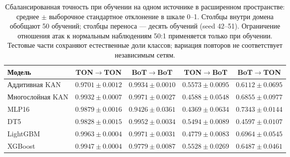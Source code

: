 \begin{table}[t]
\centering
\caption{Сбалансированная точность при обучении на одном источнике в расширенном пространстве: среднее $\pm$ выборочное стандартное отклонение в шкале 0--1. Столбцы внутри домена обобщают 50 обучений; столбцы переноса --- десять обучений (seed 42--51). Ограничение отношения атак к нормальным наблюдениям 50:1 применяется только при обучении. Тестовые части сохраняют естественные доли классов; вариация повторов не соответствует независимым сетям.}
\label{tab:supp-cross-dispersion}
\footnotesize
\setlength{\tabcolsep}{4pt}
\begin{tabular}{lcccc}
\toprule
Модель & TON$\to$TON & BoT$\to$BoT & TON$\to$BoT & BoT$\to$TON \\
\midrule
Аддитивная KAN & $0.9701 \pm 0.0012$ & $0.9934 \pm 0.0010$ & $0.5573 \pm 0.0095$ & $0.6112 \pm 0.0695$ \\
Многослойная KAN & $0.9932 \pm 0.0007$ & $0.9971 \pm 0.0027$ & $0.4588 \pm 0.0548$ & $0.6855 \pm 0.0977$ \\
MLP16 & $0.9879 \pm 0.0016$ & $0.9426 \pm 0.0361$ & $0.4369 \pm 0.0634$ & $0.7343 \pm 0.0144$ \\
DT5 & $0.9828 \pm 0.0015$ & $0.9952 \pm 0.0034$ & $0.5494 \pm 0.0089$ & $0.4597 \pm 0.0107$ \\
LightGBM & $0.9963 \pm 0.0004$ & $0.9971 \pm 0.0031$ & $0.4779 \pm 0.0083$ & $0.6964 \pm 0.0545$ \\
XGBoost & $0.9947 \pm 0.0004$ & $0.9779 \pm 0.0087$ & $0.5528 \pm 0.0269$ & $0.6487 \pm 0.0461$ \\
\bottomrule
\end{tabular}
\end{table}
